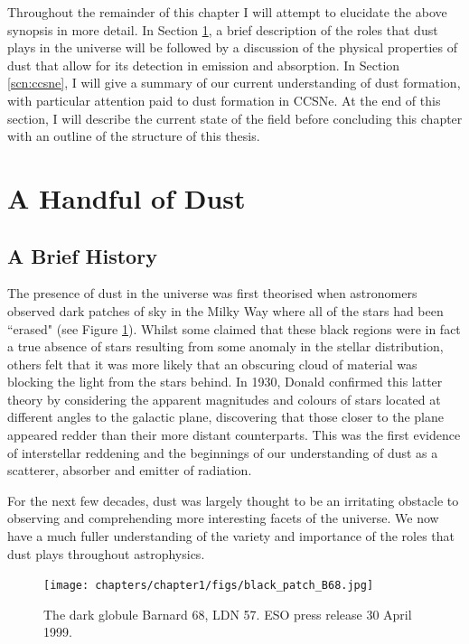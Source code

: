 Throughout the remainder of this chapter I will attempt to elucidate the above synopsis in more detail.  In Section \ref{scn:dust}, a brief description of the roles that dust plays in the universe will be followed by a discussion of the physical properties of dust that allow for its detection in emission and absorption.  In Section \ref{scn:ccsne}, I will give a summary of our current understanding of dust formation, with particular attention paid to dust formation in CCSNe.  At the end of this section, I will describe the current state of the field before concluding this chapter
with an outline of the structure of this thesis.


\section{A Handful of Dust}
\label{scn:dust}

\subsection{A Brief History}

The presence of dust in the universe was first theorised when astronomers observed dark patches of sky in the Milky Way where all of the stars had been ``erased" (see Figure \ref{intro:fig:dustpatch}).  Whilst some claimed that these black regions were in fact a true absence of stars resulting from some anomaly in the stellar distribution, others felt that it was more likely that an obscuring cloud of material was blocking the light from the stars behind.  In 1930, Donald \citeauthor{Trumpler1930} confirmed this latter theory by considering the apparent magnitudes and colours of stars located at different angles to the galactic plane, discovering that those closer to the plane appeared redder than their more distant counterparts.  This was the first evidence of interstellar reddening and the beginnings of our understanding of dust as a scatterer, absorber and emitter of radiation.

For the next few decades, dust was largely thought to be  an irritating obstacle to observing and comprehending more interesting facets of the universe.  We now have a much fuller understanding of the variety and importance of the roles that dust plays throughout astrophysics.

\begin{figure}
\centering
\texttt{[image: chapters/chapter1/figs/black\_patch\_B68.jpg]}
\caption{The dark globule Barnard 68, LDN 57.  ESO press release 30 April 1999.}
\label{intro:fig:dustpatch}
\end{figure}

